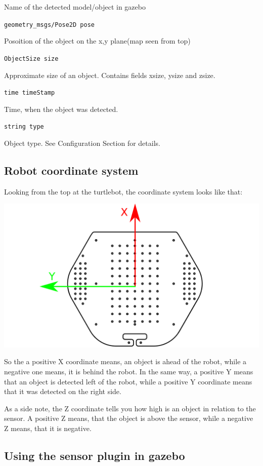 	Name of the detected model/object in gazebo

\texttt{geometry\_msgs/Pose2D pose}

	Posoition of the object on the x,y plane(map seen from top)

\texttt{ObjectSize size}

	Approximate size of an object. Contains fields xsize, ysize and zsize.

\texttt{time timeStamp}

	Time, when the object was detected.

\texttt{string type}

	Object type. See Configuration Section for details.

\newpage
\subsection{Robot coordinate system}

Looking from the top at the turtlebot, the coordinate system looks like that:

\includegraphics[width=1.0\textwidth]{ttbtop.pdf}

So the a positive X coordinate means, an object is ahead of the robot, while a negative one means, it is behind the robot. In the same way, a positive Y means that an object is detected left of the robot, while a positive Y coordinate means that it was detected on the right side.

As a side note, the Z coordinate tells you how high is an object in relation to the sensor. A positive Z means, that the object is above the sensor, while a negative Z means, that it is negative.

\subsection{Using the sensor plugin in gazebo}

